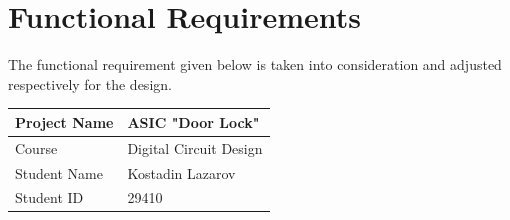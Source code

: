 \documentclass[a4paper, twoside]{report}
\begin{document}
\chapter{Functional Requirements}

The functional requirement given below is taken into consideration and adjusted respectively for the design.

\vspace{15mm} 
\begin{flushleft}
    \begin{tabular}{ | l | l |}
    \hline
    Project Name & ASIC "Door Lock" \\ \hline
    Course & Digital Circuit Design \\ \hline
    Student Name & Kostadin Lazarov \\ \hline
    Student ID & 29410 \\ \hline
    \end{tabular}
\end{flushleft}
\vspace{8mm} %
\end{document}
